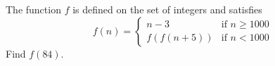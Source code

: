 The function $f$ is defined on the set of integers and satisfies \[ f(n)=\begin{cases} n-3 & \text{if } n\ge 1000 \\ f(f(n+5)) & \text{if } n<1000\end{cases}  \] Find $f(84)$.